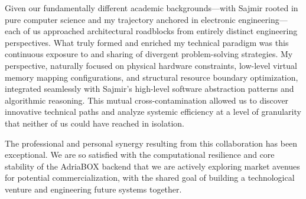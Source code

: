 Given our fundamentally different academic backgrounds—with Sajmir rooted in pure computer science and my trajectory anchored in electronic engineering—each of us approached architectural roadblocks from entirely distinct engineering perspectives. What truly formed and enriched my technical paradigm was this continuous exposure to and sharing of divergent problem-solving strategies. My perspective, naturally focused on physical hardware constraints, low-level virtual memory mapping configurations, and structural resource boundary optimization, integrated seamlessly with Sajmir's high-level software abstraction patterns and algorithmic reasoning. This mutual cross-contamination allowed us to discover innovative technical paths and analyze systemic efficiency at a level of granularity that neither of us could have reached in isolation.

The professional and personal synergy resulting from this collaboration has been exceptional. We are so satisfied with the computational resilience and core stability of the AdriaBOX backend that we are actively exploring market avenues for potential commercialization, with the shared goal of building a technological venture and engineering future systems together.